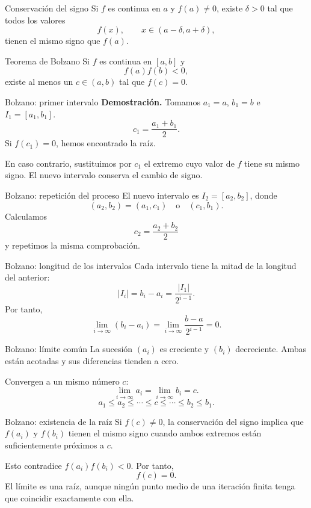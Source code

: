 \documentclass[original_version/main.tex]{subfiles}
\begin{document}
\begin{frame}{Conservación del signo}
Si $f$ es continua en $a$ y $f(a)\ne0$, existe $\delta>0$ tal que todos los valores\[f(x),\qquad x\in(a-\delta,a+\delta),\]tienen el mismo signo que $f(a)$.
\end{frame}

\begin{frame}{Teorema de Bolzano}
Si $f$ es continua en $[a,b]$ y\[f(a)f(b)<0,\]existe al menos un $c\in(a,b)$ tal que $f(c)=0$.
\end{frame}

\begin{frame}{Bolzano: primer intervalo}
\textbf{Demostración.} Tomamos $a_1=a$, $b_1=b$ e $I_1=[a_1,b_1]$.\[c_1=\frac{a_1+b_1}{2}.\]Si $f(c_1)=0$, hemos encontrado la raíz.\par\medskip En caso contrario, sustituimos por $c_1$ el extremo cuyo valor de $f$ tiene su mismo signo. El nuevo intervalo conserva el cambio de signo.
\end{frame}

\begin{frame}{Bolzano: repetición del proceso}
El nuevo intervalo es $I_2=[a_2,b_2]$, donde\[(a_2,b_2)=(a_1,c_1)\quad\text{o}\quad(c_1,b_1).\]Calculamos\[c_2=\frac{a_2+b_2}{2}\]y repetimos la misma comprobación.
\end{frame}

\begin{frame}{Bolzano: longitud de los intervalos}
Cada intervalo tiene la mitad de la longitud del anterior:\[|I_i|=b_i-a_i=\frac{|I_1|}{2^{i-1}}.\]Por tanto,\[\lim_{i\to\infty}(b_i-a_i)=\lim_{i\to\infty}\frac{b-a}{2^{i-1}}=0.\]
\end{frame}

\begin{frame}{Bolzano: límite común}
La sucesión $(a_i)$ es creciente y $(b_i)$ decreciente. Ambas están acotadas y sus diferencias tienden a cero.\par\medskip Convergen a un mismo número $c$:\[\lim_{i\to\infty}a_i=\lim_{i\to\infty}b_i=c.\]\[a_1\le a_2\le\cdots\le c\le\cdots\le b_2\le b_1.\]
\end{frame}

\begin{frame}{Bolzano: existencia de la raíz}
Si $f(c)\ne0$, la conservación del signo implica que $f(a_i)$ y $f(b_i)$ tienen el mismo signo cuando ambos extremos están suficientemente próximos a $c$.\par\medskip Esto contradice $f(a_i)f(b_i)<0$. Por tanto,\[\boxed{f(c)=0.}\]El límite es una raíz, aunque ningún punto medio de una iteración finita tenga que coincidir exactamente con ella.
\end{frame}
\end{document}
